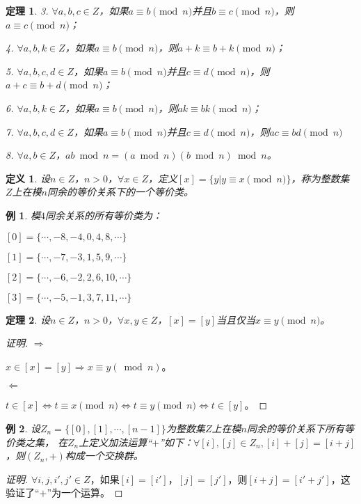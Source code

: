 \documentclass{article}
\newtheorem{Def}{定义}
\newtheorem{Thm}{定理}
\newtheorem*{Example}{例}
\begin{document}
\begin{CJK*}{UTF8}{gbsn}
\begin{Thm}
    3. $\forall a,b,c\in Z$，如果$a\equiv b\pmod{n}$并且$b\equiv c\pmod{n}$，则$a\equiv c\pmod{n}$；
  
    4. $\forall a,b,k\in Z$，如果$a\equiv b\pmod{n}$，则$a+k\equiv b+k\pmod{n}$；
  
    5. $\forall a,b,c,d\in Z$，如果$a\equiv b\pmod{n}$并且$c\equiv d\pmod{n}$，则$a+c\equiv b+d \pmod{n}$；
  
    6. $\forall a,b,k\in Z$，如果$a\equiv b\pmod{n}$，则$ak\equiv bk\pmod{n}$；
  
    7. $\forall a,b,c,d\in Z$，如果$a\equiv b\pmod{n}$并且$c\equiv d\pmod{n}$，则$ac\equiv bd \pmod{n}$
  
    8. $\forall a,b\in Z$，$ab \bmod n=(a\bmod n)(b\bmod n) \bmod n$。
  \end{Thm}
  
  \begin{Def}
    设$n\in Z$，$n>0$，$\forall x\in Z$，定义$[x]=\{y|y\equiv x \pmod{n}\}$，称为整数集$Z$上在模$n$同余的等价关系下的一个等价类。
  \end{Def}
  \begin{Example}
  模$4$同余关系的所有等价类为：
  
  $[0]=\{\cdots,-8,-4,0,4,8,\cdots\}$
  
  $[1]=\{\cdots,-7,-3,1,5,9,\cdots\}$
  
  $[2]=\{\cdots,-6,-2,2,6,10,\cdots\}$
  
  $[3]=\{\cdots,-5,-1,3,7,11,\cdots\}$
  \end{Example}
  \begin{Thm}
    设$n\in Z$，$n>0$，$\forall x,y\in Z$，$[x]=[y]$当且仅当$x\equiv y\pmod{n}$。
  \end{Thm}
  \begin{proof}[证明]
    $\Rightarrow$
  
    $x\in [x]=[y]\Rightarrow x\equiv y(\bmod n)$。
  
    $\Leftarrow$
  
    $t\in [x]\Leftrightarrow t\equiv x \pmod{n} \Leftrightarrow t\equiv y \pmod{n} \Leftrightarrow t\in [y]$。
  \end{proof}
  \begin{Example}
    设$Z_n=\{[0],[1],\cdots,[n-1]\}$为整数集$Z$上在模$n$同余的等价关系下所有等价类之集，
    在$Z_n$上定义加法运算“$+$”如下：$\forall [i],[j]\in Z_n,[i]+[j]=[i+j]$，则$(Z_n,+)$构成一个交换群。
    
  \end{Example}
  \begin{proof}[证明]
    $\forall i,j,i',j'\in Z$，如果$[i]=[i']$，$[j]=[j']$，则$[i+j]=[i'+j']$，这验证了“$+$”为一个运算。
  

\end{proof}
\end{CJK*}
\end{document}
